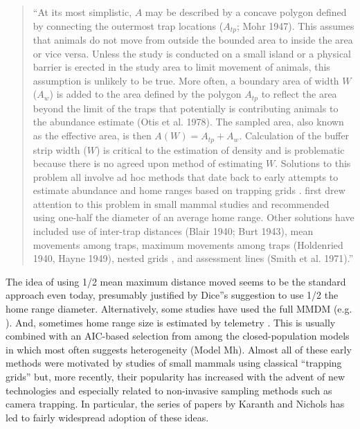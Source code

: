 \begin{quote}
  ``At its most simplistic, $A$ may be described by a concave polygon
  defined by connecting the outermost trap locations ($A_{tp}$; Mohr
  1947). This assumes that animals do not move from outside the
  bounded area to inside the area or vice versa. Unless the study is
  conducted on a small island or a physical barrier is erected in the
  study area to limit movement of animals, this assumption is unlikely
  to be true. More often, a boundary area of width $W$ ($A_{w}$) is added to
  the area defined by the polygon $A_{tp}$ to reflect the area beyond the
  limit of the traps that potentially is contributing animals to the
  abundance estimate (Otis et al. 1978). The sampled area, also known
  as the effective area, is then $A(W) = A_{tp} + A_{w}$. Calculation of the
  buffer strip width ($W$) is critical to the estimation of density and
  is problematic because there is no agreed upon method of estimating
  $W$. Solutions to this problem all involve ad hoc methods that date
  back to early attempts to estimate abundance and home ranges based
  on trapping grids 
  \citep[see][]{hayne:1949}. \citet{dice:1938} first drew attention
  to this problem in small mammal studies and recommended using
  one-half the diameter of an average home range. Other solutions have
  included use of inter-trap distances (Blair 1940; Burt 1943), mean
  movements among traps, maximum movements among traps (Holdenried
  1940, Hayne 1949), nested grids \citep{otis_etal:1978}, and assessment
  lines (Smith et al. 1971).''
\end{quote}

The idea of using 1/2 mean maximum distance moved
\citep{wilson_anderson:1985a} seems to be the standard approach even
today, presumably justified by Dice''s suggestion to use 1/2 the home
range diameter. Alternatively, some studies have used the full MMDM
(e.g. \citet{parmenter_etal:2003}). And, sometimes home range size is
estimated by telemetry \citep{karanth:1995}. This is usually combined
with an AIC-based selection from among the closed-population models in
\citet{otis_etal:1978} which most often suggests heterogeneity (Model
Mh).  Almost all of these early methods were motivated by studies of
small mammals using classical ``trapping grids'' but, more recently,
their popularity has increased with the advent of new technologies and
especially related to non-invasive sampling methods such as camera
trapping. In particular, the series of papers by Karanth and Nichols
\citep{karanth:1995, karanth_nichols:1998, karanth_nichols:2002} 
has led to fairly widespread adoption of these ideas.


